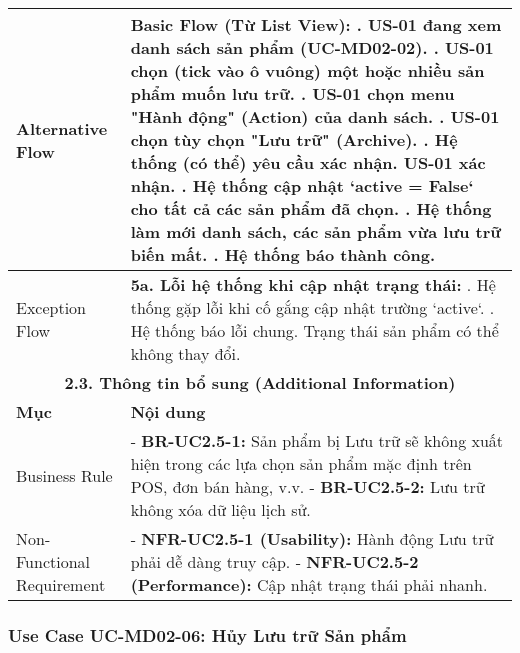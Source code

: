 \begin{longtable}{|m{4cm}|p{11cm}|}
\hline
Alternative Flow & \textbf{Basic Flow (Từ List View):} \newline    1. US-01 đang xem danh sách sản phẩm (UC-MD02-02). \newline    2. US-01 chọn (tick vào ô vuông) một hoặc nhiều sản phẩm muốn lưu trữ. \newline    3. US-01 chọn menu "Hành động" (Action) của danh sách. \newline    4. US-01 chọn tùy chọn "Lưu trữ" (Archive). \newline    5. Hệ thống (có thể) yêu cầu xác nhận. US-01 xác nhận. \newline    6. Hệ thống cập nhật `active = False` cho tất cả các sản phẩm đã chọn. \newline    7. Hệ thống làm mới danh sách, các sản phẩm vừa lưu trữ biến mất. \newline    8. Hệ thống báo thành công. \\
\hline
Exception Flow & \textbf{5a. Lỗi hệ thống khi cập nhật trạng thái:} \newline    1. Hệ thống gặp lỗi khi cố gắng cập nhật trường `active`. \newline    2. Hệ thống báo lỗi chung. Trạng thái sản phẩm có thể không thay đổi. \\
\hline
\multicolumn{2}{|c|}{\textbf{2.3. Thông tin bổ sung (Additional Information)}} \\
\hline
\textbf{Mục} & \textbf{Nội dung} \\
\hline
Business Rule & - \textbf{BR-UC2.5-1:} Sản phẩm bị Lưu trữ sẽ không xuất hiện trong các lựa chọn sản phẩm mặc định trên POS, đơn bán hàng, v.v. \newline - \textbf{BR-UC2.5-2:} Lưu trữ không xóa dữ liệu lịch sử. \\
\hline
Non-Functional Requirement & - \textbf{NFR-UC2.5-1 (Usability):} Hành động Lưu trữ phải dễ dàng truy cập. \newline - \textbf{NFR-UC2.5-2 (Performance):} Cập nhật trạng thái phải nhanh. \\
\hline
\end{longtable}

\subsubsection{Use Case UC-MD02-06: Hủy Lưu trữ Sản phẩm}


